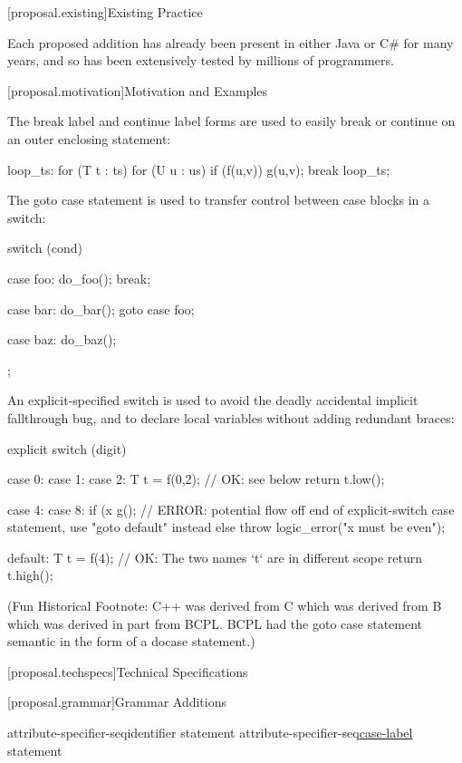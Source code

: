 \documentclass[ebook,10pt,oneside,openany,final]{memoir}
\begin{document}
[proposal.existing]{Existing Practice}%

Each proposed addition has already been present in either Java or C\# for many years, and so has been extensively tested by millions of programmers.

[proposal.motivation]{Motivation and Examples}%

\pnum
The break label and continue label forms are used to easily break or continue on an outer enclosing statement:

\begin{codeblock}
loop_ts:
  for (T t : ts)
    for (U u : us)
      if (f(u,v))
      {
        g(u,v);
        break loop_ts;
      }
\end{codeblock}

\pnum
The goto case statement is used to transfer control between case blocks in a switch:

\begin{codeblock}
  switch (cond)
  {
  case foo:
    do_foo();
    break;

  case bar:
    do_bar();
    goto case foo;

  case baz:
    do_baz();
  };
\end{codeblock}

\pnum
An explicit-specified switch is used to avoid the deadly accidental implicit fallthrough bug, and to declare local variables without adding redundant braces:

\begin{codeblock}
  explicit switch (digit)
  {
  case 0:
  case 1:
  case 2:
    T t = f(0,2); // OK: see below
    return t.low();

  case 4:
  case 8:
    if (x %
    {
      g();
      // ERROR: potential flow off end of explicit-switch case statement, use "goto default" instead
    }
    else
      throw logic_error("x must be even");

  default:
    T t = f(4); // OK: The two names `t` are in different scope
    return t.high();
  }
\end{codeblock}

\pnum
(Fun Historical Footnote: C++ was derived from C which was derived from B which was derived in part from BCPL.  BCPL had the goto case statement semantic in the form of a docase statement.)

[proposal.techspecs]{Technical Specifications}

[proposal.grammar]{Grammar Additions}

\begin{bnf}
\br
    attribute-specifier-seq\opt identifier \terminal{:} statement\br
    attribute-specifier-seq\opt \underline{case-label} \terminal{:} statement\br
\end{bnf}
\end{document}
